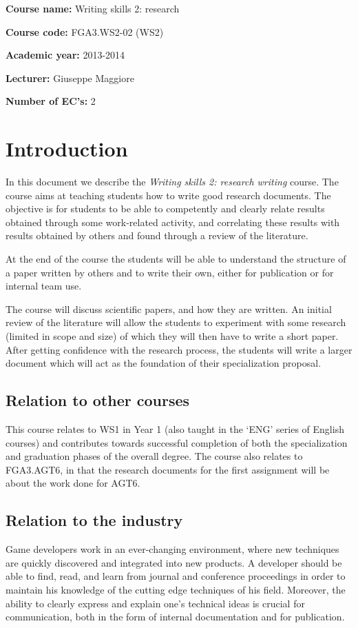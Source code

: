 \documentclass{article}
\begin{document}
\textbf{Course name:} Writing skills 2: research

\textbf{Course code:} FGA3.WS2-02 (WS2)

\textbf{Academic year:} 2013-2014

\textbf{Lecturer:} Giuseppe Maggiore

\textbf{Number of EC's:} 2


\section{Introduction}
In this document we describe the \textit{Writing skills 2: research writing} course. The course aims at teaching students how to write good research documents. The objective is for students to be able to competently and clearly relate results obtained through some work-related activity, and correlating these results with results obtained by others and found through a review of the literature.

At the end of the course the students will be able to understand the structure of a paper written by others and to write their own, either for publication or for internal team use.

The course will discuss scientific papers, and how they are written. An initial review of the literature will allow the students to experiment with some research (limited in scope and size) of which they will then have to write a short paper. After getting confidence with the research process, the students will write a larger document which will act as the foundation of their specialization proposal.


\subsection{Relation to other courses}
This course relates to WS1 in Year 1 (also taught in the ‘ENG’ series of English courses) and contributes towards successful completion of both the specialization and graduation phases of the overall degree. The course also relates to FGA3.AGT6, in that the research documents for the first assignment will be about the work done for AGT6.


\subsection{Relation to the industry}
Game developers work in an ever-changing environment, where new techniques are quickly discovered and integrated into new products. A developer should be able to find, read, and learn from journal and conference proceedings in order to maintain his knowledge of the cutting edge techniques of his field.  Moreover, the ability to clearly express and explain one's technical ideas is crucial for communication, both in the form of internal documentation and for publication.
\end{document}
